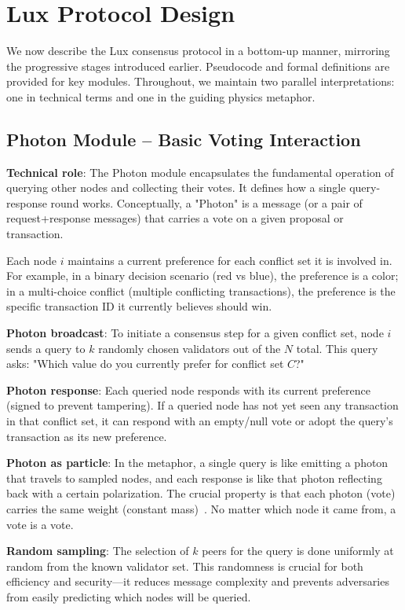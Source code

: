 \section{Lux Protocol Design}

We now describe the Lux consensus protocol in a bottom-up manner, mirroring the progressive stages introduced earlier. Pseudocode and formal definitions are provided for key modules. Throughout, we maintain two parallel interpretations: one in technical terms and one in the guiding physics metaphor.

\subsection{Photon Module – Basic Voting Interaction}

\textbf{Technical role}: The Photon module encapsulates the fundamental operation of querying other nodes and collecting their votes. It defines how a single query-response round works. Conceptually, a "Photon" is a message (or a pair of request+response messages) that carries a vote on a given proposal or transaction.

Each node $i$ maintains a current preference for each conflict set it is involved in. For example, in a binary decision scenario (red vs blue), the preference is a color; in a multi-choice conflict (multiple conflicting transactions), the preference is the specific transaction ID it currently believes should win.

\textbf{Photon broadcast}: To initiate a consensus step for a given conflict set, node $i$ sends a query to $k$ randomly chosen validators out of the $N$ total. This query asks: "Which value do you currently prefer for conflict set $C$?"

\textbf{Photon response}: Each queried node responds with its current preference (signed to prevent tampering). If a queried node has not yet seen any transaction in that conflict set, it can respond with an empty/null vote or adopt the query's transaction as its new preference.

\textbf{Photon as particle}: In the metaphor, a single query is like emitting a photon that travels to sampled nodes, and each response is like that photon reflecting back with a certain polarization. The crucial property is that each photon (vote) carries the same weight (constant mass)~\cite{saleh}. No matter which node it came from, a vote is a vote.

\textbf{Random sampling}: The selection of $k$ peers for the query is done uniformly at random from the known validator set. This randomness is crucial for both efficiency and security—it reduces message complexity and prevents adversaries from easily predicting which nodes will be queried.

